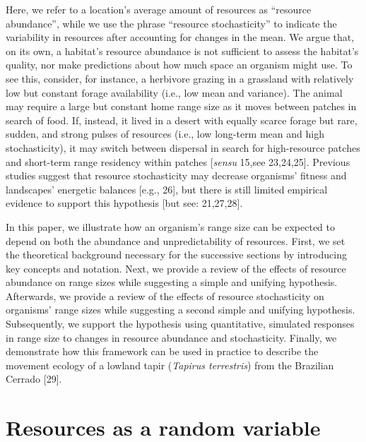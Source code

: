 \documentclass[
  12pt,
]{article}
\begin{document}
Here, we refer to a location's average amount of resources as ``resource abundance'', while we use the phrase ``resource stochasticity'' to indicate the variability in resources after accounting for changes in the mean. We argue that, on its own, a habitat's resource abundance is not sufficient to assess the habitat's quality, nor make predictions about how much space an organism might use. To see this, consider, for instance, a herbivore grazing in a grassland with relatively low but constant forage availability (i.e., low mean and variance). The animal may require a large but constant home range size as it moves between patches in search of food. If, instead, it lived in a desert with equally scarce forage but rare, sudden, and strong pulses of resources (i.e., low long-term mean and high stochasticity), it may switch between dispersal in search for high-resource patches and short-term range residency within patches {[}\emph{sensu} 15,see 23,24,25{]}. Previous studies suggest that resource stochasticity may decrease organisms' fitness and landscapes' energetic balances {[}e.g., 26{]}, but there is still limited empirical evidence to support this hypothesis {[}but see: 21,27,28{]}.

In this paper, we illustrate how an organism's range size can be expected to depend on both the abundance and unpredictability of resources. First, we set the theoretical background necessary for the successive sections by introducing key concepts and notation. Next, we provide a review of the effects of resource abundance on range sizes while suggesting a simple and unifying hypothesis. Afterwards, we provide a review of the effects of resource stochasticity on organisms' range sizes while suggesting a second simple and unifying hypothesis. Subsequently, we support the hypothesis using quantitative, simulated responses in range size to changes in resource abundance and stochasticity. Finally, we demonstrate how this framework can be used in practice to describe the movement ecology of a lowland tapir (\emph{Tapirus terrestris}) from the Brazilian Cerrado {[}29{]}.

\section{Resources as a random variable}\label{resources-as-a-random-variable}
\end{document}
